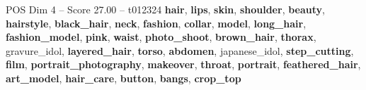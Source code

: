 \begin{textsample}{POS Dim 4 – Score 27.00 – t012324}  \label{ex:f4_pos_006}
\textbf{hair}, \textbf{lips}, \textbf{skin}, \textbf{shoulder}, \textbf{beauty}, \textbf{hairstyle}, \textbf{black\_hair}, \textbf{neck}, \textbf{fashion}, \textbf{collar}, \textbf{model}, \textbf{long\_hair}, \textbf{fashion\_model}, \textbf{pink}, \textbf{waist}, \textbf{photo\_shoot}, \textbf{brown\_hair}, \textbf{thorax}, gravure\_idol, \textbf{layered\_hair}, \textbf{torso}, \textbf{abdomen}, japanese\_idol, \textbf{step\_cutting}, \textbf{film}, \textbf{portrait\_photography}, \textbf{makeover}, \textbf{throat}, \textbf{portrait}, \textbf{feathered\_hair}, \textbf{art\_model}, \textbf{hair\_care}, \textbf{button}, \textbf{bangs}, \textbf{crop\_top}

\end{textsample}
